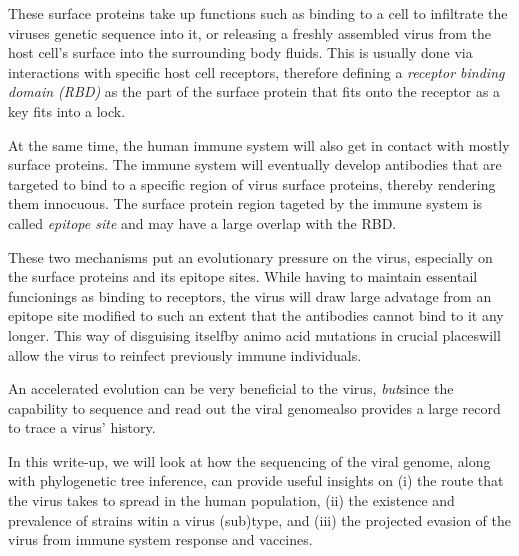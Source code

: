 These surface proteins take up functions such as binding to a cell to infiltrate the viruses genetic sequence into it, or releasing a freshly assembled virus from the host cell's surface into the surrounding body fluids. This is usually done via interactions with specific host cell receptors, therefore defining a \textit{receptor binding domain (RBD)} as the part of the surface protein that fits onto the receptor as a key fits into a lock.

At the same time, the human immune system will also get in contact with mostly surface proteins. The immune system will eventually develop antibodies that are targeted to bind to a specific region of virus surface proteins, thereby rendering them innocuous. The surface protein region tageted by the immune system is called \textit{epitope site} and may have a large overlap with the RBD.

These two mechanisms put an evolutionary pressure on the virus, especially on the surface proteins and its epitope sites. While having to maintain essentail funcionings as binding to receptors, the virus will draw large advatage from an epitope site modified to such an extent that the antibodies cannot bind to it any longer. This way of disguising itself\textemdash by animo acid mutations in crucial places\textemdash will allow the virus to reinfect previously immune individuals.

An accelerated evolution can be very beneficial to the virus, \textit{but}\textemdash since the capability to sequence and read out the viral genome\textemdash also provides a large record to trace a virus' history.

In this write-up, we will look at how the sequencing of the viral genome, along with phylogenetic tree inference, can provide useful insights on (i) the route that the virus takes to spread in the human population, (ii) the existence and prevalence of strains witin a virus (sub)type, and (iii) the projected evasion of the virus from immune system response and vaccines.

